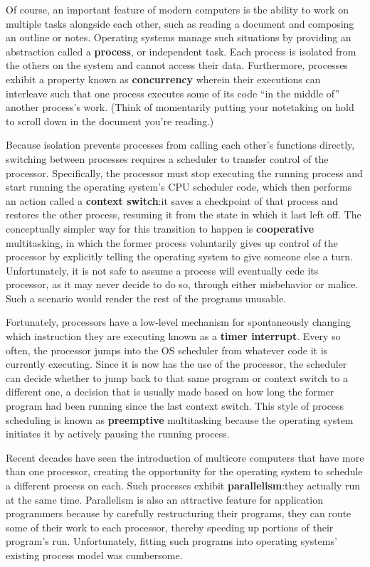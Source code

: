 \documentclass[12pt,letterpaper,openright]{report}
\begin{document}
Of course, an important feature of modern computers is the ability to work on
multiple tasks alongside each other, such as reading a document and composing an
outline or notes.  Operating systems manage such situations by providing an
abstraction called a \textbf{process}, or independent task.  Each process is isolated
from the others on the system and cannot access their data.  Furthermore, processes
exhibit a property known as \textbf{concurrency} wherein their executions can
interleave such that one process executes some of its code ``in the middle of''
another process's work.  (Think of momentarily putting your notetaking on hold to
scroll down in the document you're reading.)

Because isolation prevents processes from calling each other's functions directly,
switching between processes requires a scheduler to transfer control of the
processor.  Specifically, the processor must stop executing the running process and
start running the operating system's CPU scheduler code, which then performs an
action called a \textbf{context switch}:\@ it saves a checkpoint of that process and
restores the other process, resuming it from the state in which it last left off.
The conceptually simpler way for this transition to happen is \textbf{cooperative}
multitasking, in which the former process voluntarily gives up control of the
processor by explicitly telling the operating system to give someone else a turn.
Unfortunately, it is not safe to assume a process will eventually cede its processor,
as it may never decide to do so, through either misbehavior or malice.  Such a
scenario would render the rest of the programs unusable.

Fortunately, processors have a low-level mechanism for spontaneously changing which
instruction they are executing known as a \textbf{timer interrupt}.  Every so often,
the processor jumps into the OS scheduler from whatever code it is currently
executing.  Since it is now has the use of the processor, the scheduler can decide
whether to jump back to that same program or context switch to a different one, a
decision that is usually made based on how long the former program had been running
since the last context switch.  This style of process scheduling is known as
\textbf{preemptive} multitasking because the operating system initiates it by
actively pausing the running process.

Recent decades have seen the introduction of multicore computers that have more than
one processor, creating the opportunity for the operating system to schedule a
different process on each.  Such processes exhibit \textbf{parallelism}:\@ they
actually run at the same time.  Parallelism is also an attractive feature for
application programmers because by carefully restructuring their programs, they can
route some of their work to each processor, thereby speeding up portions of their
program's run.  Unfortunately, fitting such programs into operating systems' existing
process model was cumbersome.
\end{document}
